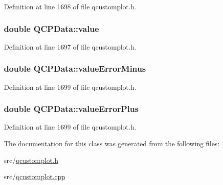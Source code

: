 Definition at line 1698 of file qcustomplot.\-h.

\hypertarget{class_q_c_p_data_aefe1ecf8fa2e34ed875b67523e542373}{
\subsubsection[{value}]{\setlength{\rightskip}{0pt plus 5cm}double Q\-C\-P\-Data\-::value}}\label{class_q_c_p_data_aefe1ecf8fa2e34ed875b67523e542373}


Definition at line 1697 of file qcustomplot.\-h.

\hypertarget{class_q_c_p_data_a51d8f42bf4d49a1f263531e70cadd6a3}{
\subsubsection[{value\-Error\-Minus}]{\setlength{\rightskip}{0pt plus 5cm}double Q\-C\-P\-Data\-::value\-Error\-Minus}}\label{class_q_c_p_data_a51d8f42bf4d49a1f263531e70cadd6a3}


Definition at line 1699 of file qcustomplot.\-h.

\hypertarget{class_q_c_p_data_ad26912552d03485ea20d91dcad16aa8f}{
\subsubsection[{value\-Error\-Plus}]{\setlength{\rightskip}{0pt plus 5cm}double Q\-C\-P\-Data\-::value\-Error\-Plus}}\label{class_q_c_p_data_ad26912552d03485ea20d91dcad16aa8f}


Definition at line 1699 of file qcustomplot.\-h.



The documentation for this class was generated from the following files\-:\begin{DoxyCompactItemize}
\item 
src/\hyperlink{qcustomplot_8h}{qcustomplot.\-h}\item 
src/\hyperlink{qcustomplot_8cpp}{qcustomplot.\-cpp}\end{DoxyCompactItemize}
